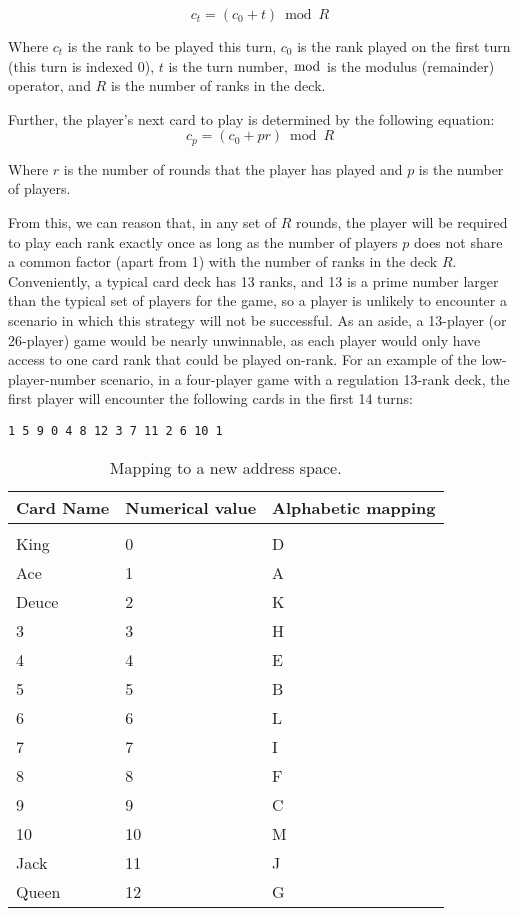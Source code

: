 \documentclass[12pt]{article}
\begin{document}
\begin{equation}
c_t = (c_0 + t) \bmod R
\end{equation}

Where $c_t$ is the rank to be played this turn, $c_0$ is the rank played on the
first turn (this turn is indexed 0), $t$ is the turn number, $\bmod$ is the
modulus (remainder) operator, and $R$ is the number of ranks in the deck.

Further, the player's next card to play is determined by the following equation:
\begin{equation}
c_p = (c_0 + pr) \bmod R
\end{equation}

Where $r$ is the number of rounds that the player has played and $p$ is the
number of players.

From this, we can reason that, in any set of $R$ rounds, the player will be
required to play each rank exactly once as long as the number of players $p$
does not share a common factor (apart from 1) with the number of ranks in the
deck $R$.  Conveniently, a typical card deck has 13 ranks, and 13 is a prime
number larger than the typical set of players for the game, so a player is
unlikely to encounter a scenario in which this strategy will not be successful.
As an aside, a 13-player (or 26-player) game would be nearly unwinnable, as
each player would only have access to one card rank that could be played
on-rank. For an example of the low-player-number scenario, in a four-player
game with a regulation 13-rank deck, the first player will encounter the
following cards in the first 14 turns:

\begin{lstlisting}
1 5 9 0 4 8 12 3 7 11 2 6 10 1
\end{lstlisting}

\begin{table}
    \begin{center}
        \begin{tabu}to 0.8\linewidth {XXX}
            Card Name & Numerical value & Alphabetic mapping\\
            \hline\\
            King & 0 & D\\
            Ace & 1 & A\\
            Deuce & 2 & K\\
            3 & 3 & H\\
            4 & 4 & E\\
            5 & 5 & B\\
            6 & 6 & L\\
            7 & 7 & I\\
            8 & 8 & F\\
            9 & 9 & C\\
            10 & 10 & M\\
            Jack & 11 & J\\
            Queen & 12 & G\\
        \end{tabu}
        \caption{Mapping to a new address space.}
        \label{table:map}
    \end{center}
\end{table}
\end{document}
